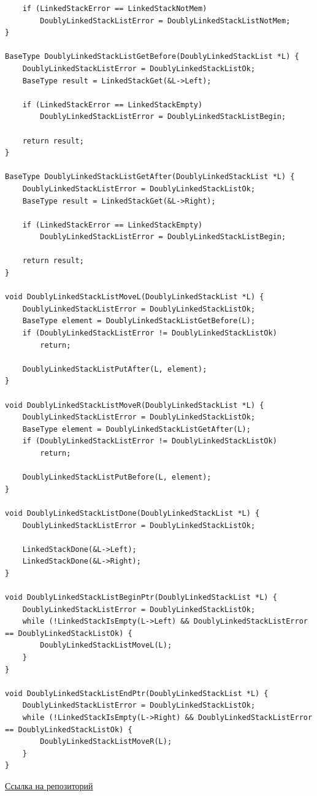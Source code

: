 \documentclass[a4paper,14pt]{extarticle}
\begin{document}
\begin{enumerate}
\begin{verbatim}
    if (LinkedStackError == LinkedStackNotMem) 
        DoublyLinkedStackListError = DoublyLinkedStackListNotMem;
}

BaseType DoublyLinkedStackListGetBefore(DoublyLinkedStackList *L) {
    DoublyLinkedStackListError = DoublyLinkedStackListOk;
    BaseType result = LinkedStackGet(&L->Left);

    if (LinkedStackError == LinkedStackEmpty)
        DoublyLinkedStackListError = DoublyLinkedStackListBegin;

    return result;
}

BaseType DoublyLinkedStackListGetAfter(DoublyLinkedStackList *L) {
    DoublyLinkedStackListError = DoublyLinkedStackListOk;
    BaseType result = LinkedStackGet(&L->Right);

    if (LinkedStackError == LinkedStackEmpty)
        DoublyLinkedStackListError = DoublyLinkedStackListBegin;

    return result;
}

void DoublyLinkedStackListMoveL(DoublyLinkedStackList *L) {
    DoublyLinkedStackListError = DoublyLinkedStackListOk;
    BaseType element = DoublyLinkedStackListGetBefore(L);
    if (DoublyLinkedStackListError != DoublyLinkedStackListOk) 
        return;

    DoublyLinkedStackListPutAfter(L, element);
}

void DoublyLinkedStackListMoveR(DoublyLinkedStackList *L) {
    DoublyLinkedStackListError = DoublyLinkedStackListOk;
    BaseType element = DoublyLinkedStackListGetAfter(L);
    if (DoublyLinkedStackListError != DoublyLinkedStackListOk) 
        return;

    DoublyLinkedStackListPutBefore(L, element);
}

void DoublyLinkedStackListDone(DoublyLinkedStackList *L) {
    DoublyLinkedStackListError = DoublyLinkedStackListOk;

    LinkedStackDone(&L->Left);
    LinkedStackDone(&L->Right);
}

void DoublyLinkedStackListBeginPtr(DoublyLinkedStackList *L) {
    DoublyLinkedStackListError = DoublyLinkedStackListOk;
    while (!LinkedStackIsEmpty(L->Left) && DoublyLinkedStackListError == DoublyLinkedStackListOk) {
        DoublyLinkedStackListMoveL(L);
    }
}

void DoublyLinkedStackListEndPtr(DoublyLinkedStackList *L) {
    DoublyLinkedStackListError = DoublyLinkedStackListOk;
    while (!LinkedStackIsEmpty(L->Right) && DoublyLinkedStackListError == DoublyLinkedStackListOk) {
        DoublyLinkedStackListMoveR(L);
    }
}
    \end{verbatim}
\end{enumerate}
\href{https://github.com/IAmProgrammist/CNuke/tree/main}{Ссылка на репозиторий}
\end{document}
